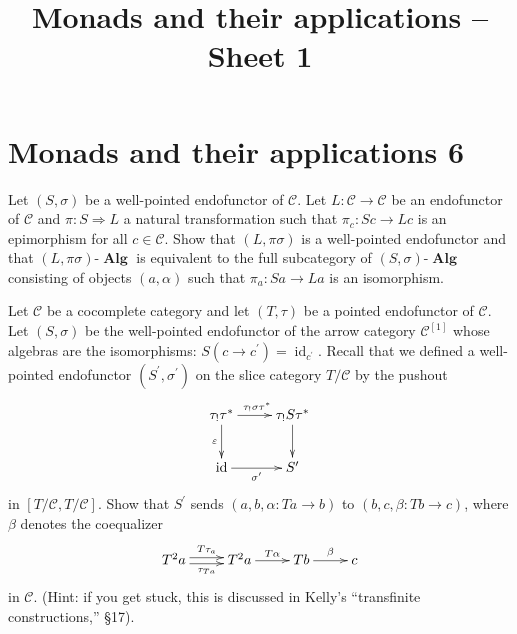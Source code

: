 \documentclass[12pt, a4paper]{article}
\date{}
\title{Monads and their applications -- Sheet 1}
\DeclareMathOperator{\id}{id}
\DeclareMathOperator{\Alg}{\mathbf{Alg}}
\newcommand{\ca}[1]{\mathscr{#1}}
\theoremstyle{plain}
\theoremstyle{definition}
\theoremstyle{citing}
\theoremstyle{citingdfn}
\numberwithin{equation}{section}
\begin{document}

\pagestyle{empty}
\section*{Monads and their applications 6}

\begin{question} 
 Let $(S, \sigma)$ be a well-pointed endofunctor of $\ca{C}$. Let $L \colon \ca{C} \rightarrow \ca{C}$ be an endofunctor of $\ca{C}$ and $\pi \colon S \Rightarrow L$ a natural transformation such that $\pi_c \colon Sc \rightarrow Lc$ is an epimorphism for all $c \in \ca{C}$. Show that $(L,\pi \sigma)$ is a well-pointed endofunctor and that $(L,\pi\sigma)\mbox{-}\Alg$ is equivalent to the full subcategory of $(S,\sigma)\mbox{-}\Alg$ consisting of objects $(a,\alpha)$ such that $\pi_a \colon Sa \rightarrow La$ is an isomorphism.
 \end{question}

\begin{question}
 Let $\ca{C}$ be a cocomplete category and let $(T,\tau)$ be a pointed endofunctor of $\ca{C}$. Let $(S,\sigma)$ be the well-pointed endofunctor of the arrow category $\ca{C}^{[1]}$ whose algebras are the isomorphisms: $S(c \rightarrow c^{\prime})=\id_{c^{\prime}}$. Recall that we defined a well-pointed endofunctor $(S^{\prime},\sigma^{\prime})$ on the slice category $T \slash \ca{C}$ by the pushout
 \[
 \xymatrix{\tau_{!} \tau^{\ast} \ar[d]_{\varepsilon} \ar[r]^{\tau_{!} \sigma \tau^{\ast} } & \tau_{!} S \tau^{\ast} \ar[d] \\ \id \ar[r]_-{\sigma^{\prime}} & S^{\prime} }
 \]
 in $[T \slash \ca{C},T \slash \ca{C}]$. Show that $S^{\prime}$ sends $(a,b,\alpha \colon Ta \rightarrow b)$ to $(b,c,\beta \colon Tb \rightarrow c)$, where $\beta$ denotes the coequalizer
 \[
 \xymatrix{T^2 a \ar@<0.5ex>[r]^{T\tau_a} \ar@<-0.5ex>[r]_{\tau_{Ta}} & T^2 a \ar[r]^-{T\alpha} & Tb \ar[r]^-{\beta} & c }
 \]
 in $\ca{C}$. (Hint: if you get stuck, this is discussed in Kelly's ``transfinite constructions,'' \S 17).
\end{question}
\end{document}
